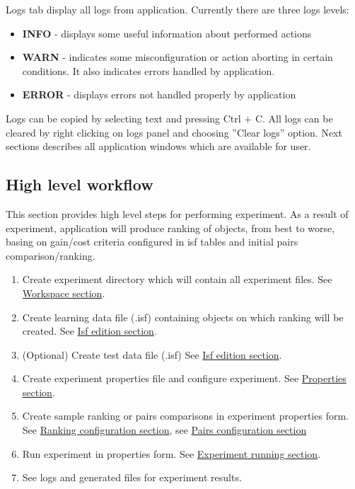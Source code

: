 Logs tab display all logs from application. 
Currently there are three logs levels:
\begin{itemize}
	\item \textbf{INFO} - displays some useful information about performed actions
	\item \textbf{WARN} - indicates some misconfiguration or action aborting in certain conditions. It also indicates errors handled by application.
	\item \textbf{ERROR} - displays errors not handled properly by application
\end{itemize}

Logs can be copied by selecting text and pressing Ctrl + C. All logs can be cleared by right clicking on logs panel and choosing ''Clear logs'' option.
\newline\newline
Next sections describes all application windows which are available for user.

\subsection{High level workflow}\label{sub:overview-flow}

This section provides high level steps for performing experiment. As a result of experiment, application will produce ranking of objects, from best to worse, basing on gain/cost criteria configured in isf tables and initial pairs comparison/ranking.

\begin{enumerate}
	\item Create experiment directory which will contain all experiment files.
	See \hyperref[section:workspace]{Workspace section}.
	\item Create learning data file (.isf) containing objects on which ranking will be created.
	See \hyperref[section:isf-table]{Isf edition section}.
	\item (Optional) Create test data file (.isf)
	See \hyperref[section:isf-table]{Isf edition section}.
	\item Create experiment properties file and configure experiment.
	See \hyperref[section:properties]{Properties section}.
	\item Create sample ranking or pairs comparisons in experiment properties form.
	See \hyperref[sub:properties-ranking]{Ranking configuration section},
	see \hyperref[sub:properties-pairs]{Pairs configuration section}
	\item Run experiment in properties form.
	See \hyperref[section:experiment-running]{Experiment running section}.
	\item See logs and generated files for experiment results.
\end{enumerate}

